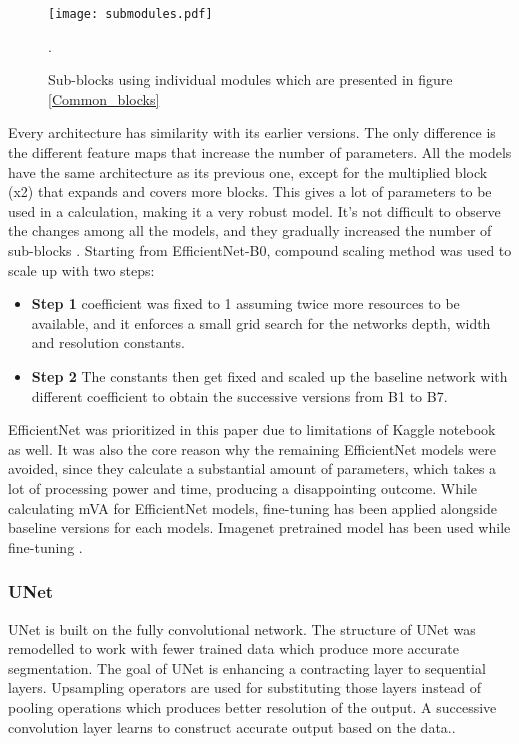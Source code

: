\documentclass[conference]{IEEEtran}
\begin{document}
\begin{figure}[h!]
    \centering
    \texttt{[image: submodules.pdf]}
    \caption{Sub-blocks using individual modules which are presented in figure \ref{Common_blocks}}.
    \label{submodules}
\end{figure}

Every architecture has similarity with its earlier versions. The only difference is the different feature maps that increase the number of parameters. All the models have the same architecture as its previous one, except for the multiplied block (x2) that expands and covers more blocks. This gives a lot of parameters to be used in a calculation, making it a very robust model.
It’s not difficult to observe the changes among all the models, and they gradually increased the number of sub-blocks \cite{tan2019efficientnet}. Starting from EfficientNet-B0, compound scaling method was used to scale up with two steps:
\begin{itemize}
    \item \textbf{Step 1} coefficient was fixed to 1 assuming twice more resources to be available, and it enforces a small grid search for the networks depth, width and resolution constants.
    \item \textbf{Step 2} The constants then get fixed and scaled up the baseline network with different coefficient to obtain the successive versions from B1 to B7.
\end{itemize}

EfficientNet was prioritized in this paper due to limitations of Kaggle notebook as well. It was also the core reason why the remaining EfficientNet models were avoided, since they calculate a substantial amount of parameters, which takes a lot of processing power and time, producing a disappointing outcome. While calculating mVA for EfficientNet models, fine-tuning has been applied alongside baseline versions for each models. Imagenet pretrained model has been used while fine-tuning \cite{Yakubovskiy:2019}. 

\subsubsection{UNet}
UNet is built on the fully convolutional network. 
The structure of UNet was remodelled to work with fewer trained data which produce more accurate segmentation. The goal of UNet is enhancing a contracting layer to sequential layers. Upsampling operators are used for substituting those layers instead of pooling operations which produces better resolution of the output. A successive convolution layer learns to construct accurate output based on the data.\cite{ronneberger2015u}.
\end{document}
